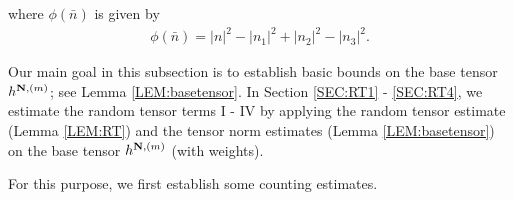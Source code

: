 \documentclass[%
11pt,  reqno]{amsart}
\newcommand{\1}{\hspace{0.2mm}\text{I}\hspace{0.2mm}}
\newcommand{\noi}{\noindent}
\numberwithin{equation}{section}
\numberwithin{theorem}{section}
\begin{document}
\noi
where $\phi(\bar n)$ is given by 
\begin{align}
\label{phi1}
\phi(\bar n) = |n|^2 - |n_1|^2 + |n_2|^2 - |n_3|^2.
\end{align}


\noi
Our main goal in this subsection is 
to establish basic bounds
on the base tensor $h^{{\bf N}, (m)}$;
see Lemma \ref{LEM:basetensor}.
In Section \ref{SEC:RT1} - \ref{SEC:RT4}, 
we estimate
the random tensor terms I - IV
by applying the random tensor estimate (Lemma \ref{LEM:RT})
and the tensor norm estimates (Lemma \ref{LEM:basetensor})
on the base tensor $h^{{\bf N}, (m)}$ (with weights).





For this purpose, 
we first establish some counting estimates.
\end{document}
